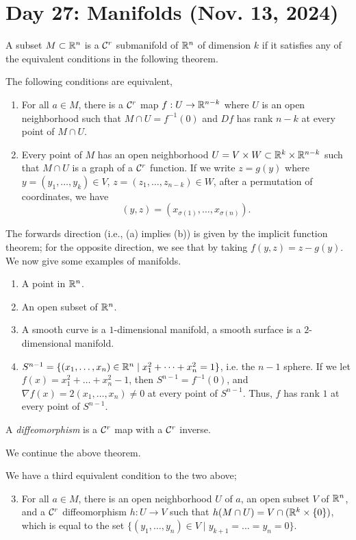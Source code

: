 \section{Day 27: Manifolds (Nov. 13, 2024)}
A subset $M \subset \mathbb R^n$ is a $\mathcal C^r$ submanifold of $\mathbb R^n$ of dimension $k$ if it satisfies any of the equivalent conditions in the following theorem.
\begin{simplethm}
    The following conditions are equivalent,
    \begin{enumerate}[label=(\alph*)]
        \item For all $a \in M$, there is a $\mathcal C^r$ map $f : U \to \mathbb R^{n-k}$ where $U$ is an open neighborhood such that $M \cap U = f^{-1}(0)$ and $Df$ has rank $n-k$ at every point of $M \cap U$.
        \item Every point of $M$ has an open neighborhood $U = V \times W \subset \mathbb R^{k} \times \mathbb R^{n-k}$ such that $M \cap U$ is a graph of a $\mathcal C^r$ function. If we write $z = g(y)$ where $y = (y_1, \dots, y_k) \in V$, $z = (z_1, \dots, z_{n-k}) \in W$, after a permutation of coordinates, we have
        \[ (y, z) = (x_{\sigma(1)}, \dots, x_{\sigma(n)}). \]
    \end{enumerate}
\end{simplethm}
\noindent The forwards direction (i.e., (a) implies (b)) is given by the implicit function theorem; for the opposite direction, we see that by taking $f(y, z) = z - g(y)$.
\medskip\newline
We now give some examples of manifolds.
\begin{enumerate}[label=(\alph*)]
    \item A point in $\mathbb R^n$.
    \item An open subset of $\mathbb R^n$.
    \item A smooth curve is a $1$-dimensional manifold, a smooth surface is a $2$-dimensional manifold.
    \item $S^{n-1} = \{(x_1, \dots, x_n) \in \mathbb R^n \mid x_1^2 + \dots + x_n^2 = 1\}$, i.e. the $n-1$ sphere. If we let $f(x) = x_1^2 + \dots + x_n^2 - 1$, then $S^{n-1} = f^{-1}({0})$, and $\nabla f(x) = 2(x_1, \dots, x_n) \neq 0$ at every point of $S^{n-1}$. Thus, $f$ has rank $1$ at every point of $S^{n-1}$.
\end{enumerate}
\begin{definition}
    A \textit{diffeomorphism} is a $\mathcal C^r$ map with a $\mathcal C^r$ inverse.
\end{definition}
\noindent We continue the above theorem.
\begin{simplethm}
    We have a third equivalent condition to the two above;
    \begin{enumerate}[label=(\alph*)]
        \setcounter{enumi}{2}
        \item For all $a \in M$, there is an open neighborhood $U$ of $a$, an open subset $V$ of $\mathbb R^n$, and a $\mathcal C^r$ diffeomorphism $h : U \to V$ such that $h(M \cap U) = V \cap (\mathbb R^k \times \{0\})$, which is equal to the set $\{(y_1, \dots, y_n) \in V \mid y_{k+1} = \dots = y_n = 0 \}$.
    \end{enumerate}
\end{simplethm}
